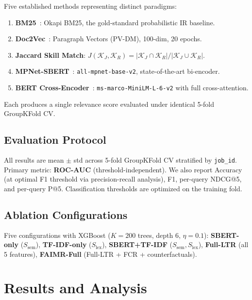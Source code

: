\documentclass[smallcondensed,numbers]{sn-jnl}
\begin{document}
Five established methods representing distinct paradigms:
\begin{enumerate}
    \item \textbf{BM25}~\cite{robertson2009probabilistic}: Okapi BM25, the gold-standard probabilistic IR baseline.
    \item \textbf{Doc2Vec}~\cite{le2014doc2vec}: Paragraph Vectors (PV-DM), 100-dim, 20 epochs.
    \item \textbf{Jaccard Skill Match}: $J(\mathcal{K}_J, \mathcal{K}_R) = |\mathcal{K}_J \cap \mathcal{K}_R|/|\mathcal{K}_J \cup \mathcal{K}_R|$.
    \item \textbf{MPNet-SBERT}~\cite{song2020mpnet}: \texttt{all-mpnet-base-v2}, state-of-the-art bi-encoder.
    \item \textbf{BERT Cross-Encoder}~\cite{nogueira2019crossencoder}: \texttt{ms-marco-MiniLM-L-6-v2} with full cross-attention.
\end{enumerate}

Each produces a single relevance score evaluated under identical 5-fold GroupKFold CV.

\subsection{Evaluation Protocol}

All results are mean $\pm$ std across 5-fold GroupKFold CV stratified by \texttt{job\_id}. Primary metric: \textbf{ROC-AUC} (threshold-independent). We also report Accuracy (at optimal F1 threshold via precision-recall analysis), F1, per-query NDCG@5, and per-query P@5. Classification thresholds are optimized on the training fold.

\subsection{Ablation Configurations}

Five configurations with XGBoost ($K{=}200$ trees, depth 6, $\eta{=}0.1$):
\textbf{SBERT-only} ($S_\text{sem}$), \textbf{TF-IDF-only} ($S_\text{lex}$), \textbf{SBERT+TF-IDF} ($S_\text{sem}, S_\text{lex}$), \textbf{Full-LTR} (all 5 features), \textbf{FAIMR-Full} (Full-LTR + FCR + counterfactuals).

\section{Results and Analysis}
\label{sec:results}
\end{document}
